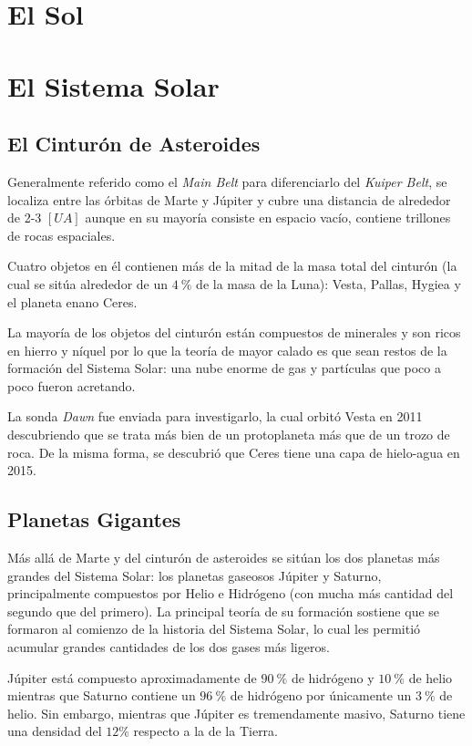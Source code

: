 \documentclass{tufte-handout}
\begin{document}
\section{El Sol}

\clearpage

\section{El Sistema Solar}

\subsection{El Cinturón de Asteroides}

Generalmente referido como el \emph{Main Belt} para diferenciarlo del \emph{Kuiper Belt}, se localiza entre las órbitas de Marte y Júpiter y cubre una distancia de alrededor de 2-3 $[UA]$ aunque en su mayoría consiste en espacio vacío, contiene trillones de rocas espaciales.

Cuatro objetos en él contienen más de la mitad de la masa total del cinturón (la cual se sitúa alrededor de un $4~\%$ de la masa de la Luna): Vesta, Pallas, Hygiea y el planeta enano Ceres.

La mayoría de los objetos del cinturón están compuestos de minerales y son ricos en hierro y níquel por lo que la teoría de mayor calado es que sean restos de la formación del Sistema Solar: una nube enorme de gas y partículas que poco a poco fueron acretando.

La sonda \emph{Dawn} fue enviada para investigarlo, la cual orbitó Vesta en 2011 descubriendo que se trata más bien de un protoplaneta más que de un trozo de roca. De la misma forma, se descubrió que Ceres tiene una capa de hielo-agua en 2015.

\subsection{Planetas Gigantes}

Más allá de Marte y del cinturón de asteroides se sitúan los dos planetas más grandes del Sistema Solar: los planetas gaseosos Júpiter y Saturno, principalmente compuestos por Helio e Hidrógeno (con mucha más cantidad del segundo que del primero). La principal teoría de su formación sostiene que se formaron al comienzo de la historia del Sistema Solar, lo cual les permitió acumular grandes cantidades de los dos gases más ligeros.

Júpiter está compuesto aproximadamente de $90~\%$ de hidrógeno y $10~\%$ de helio mientras que Saturno contiene un $96~\%$ de hidrógeno por únicamente un $3~\%$ de helio. Sin embargo, mientras que Júpiter es tremendamente masivo, Saturno tiene una densidad del $12\%$ respecto a la de la Tierra.
\end{document}
